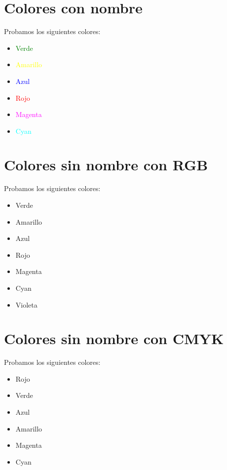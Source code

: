 \documentclass[10pt,a4paper]{article}
\begin{document}
 \section{Colores con nombre}
 Probamos los siguientes colores:
 \begin{itemize}
   \item \textcolor{green}{Verde}
   \item \textcolor{yellow}{Amarillo}
   \item \textcolor{blue}{Azul}
   \item \textcolor{red}{Rojo}
   \item \textcolor{magenta}{Magenta}
   \item \textcolor{cyan}{Cyan}
   
 \end{itemize}
 
 \section{Colores sin nombre con RGB}
 
 Probamos los siguientes colores:
 \begin{itemize}
   \item \textcolor[rgb]{0,1,0}{Verde}
   \item \textcolor[rgb]{1,1,0}{Amarillo}
   \item \textcolor[rgb]{0,0,1}{Azul}
   \item \textcolor[rgb]{1,0,0}{Rojo}
   \item \textcolor[rgb]{1,0,1}{Magenta}   
   \item \textcolor[rgb]{0,1,1}{Cyan}
   \item \textcolor[rgb]{1,0.5,1}{Violeta}
 \end{itemize}

\section{Colores sin nombre con CMYK}
 
 Probamos los siguientes colores:
 \begin{itemize}
   \item \textcolor[cmyk]{0,1,1,0}{Rojo}
   \item \textcolor[cmyk]{1,0,1,0}{Verde}
   \item \textcolor[cmyk]{1,1,0,0}{Azul}
   \item \textcolor[cmyk]{0,0,1,0}{Amarillo}
   \item \textcolor[cmyk]{0,1,0,0}{Magenta}
   \item \textcolor[cmyk]{1,0,0,0}{Cyan}
 \end{itemize}
 
 
\end{document}
